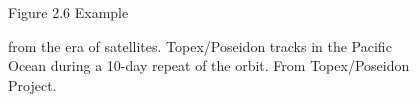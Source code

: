 \begin{figure}[b!]
\vspace{-1ex}
\centering
\footnotesize
Figure 2.6 Example \rule{0mm}{3ex}from the era of satellites.
Topex/Poseidon tracks in the
Pacific\\Ocean during a 10-day repeat of the orbit. From
Topex/Poseidon Project.

\label{fig:Fig2-6}
\end{figure}

\vspace{-1ex}
